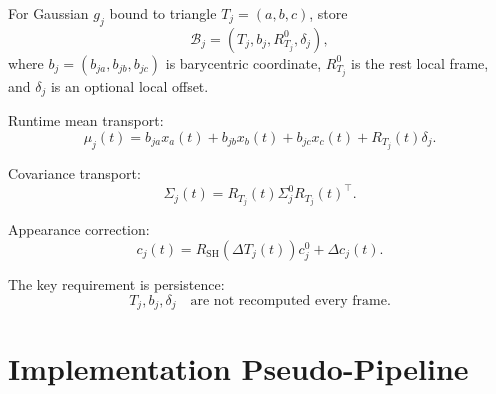 \documentclass[11pt,a4paper]{article}
\begin{document}
For Gaussian $g_j$ bound to triangle $T_j=(a,b,c)$, store
\[
\mathcal{B}_j=(T_j,b_j,R_{T_j}^0,\delta_j),
\]
where $b_j=(b_{ja},b_{jb},b_{jc})$ is barycentric coordinate, $R_{T_j}^0$ is the rest local frame, and $\delta_j$ is an optional local offset.

Runtime mean transport:
\[
\mu_j(t)=b_{ja}x_a(t)+b_{jb}x_b(t)+b_{jc}x_c(t)+R_{T_j}(t)\delta_j.
\]

Covariance transport:
\[
\Sigma_j(t)=R_{T_j}(t)\Sigma_j^0R_{T_j}(t)^\top.
\]

Appearance correction:
\[
c_j(t)=R_{\mathrm{SH}}(\Delta T_j(t))c_j^0+\Delta c_j(t).
\]

The key requirement is persistence:
\[
T_j,b_j,\delta_j\quad\text{are not recomputed every frame.}
\]

\section{Implementation Pseudo-Pipeline}
\end{document}
